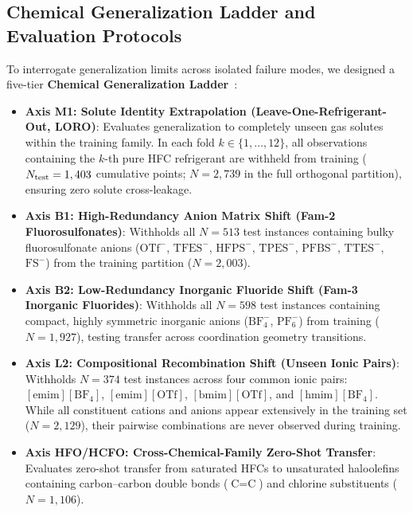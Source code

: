 \subsection{Chemical Generalization Ladder and Evaluation Protocols}
\label{subsec:generalization_ladder}

To interrogate generalization limits across isolated failure modes, we designed a five-tier \textbf{Chemical Generalization Ladder}~\cite{Choudhary2024_OODBenchmark,Wu2018_MoleculeNet}:

\begin{itemize}
    \item \textbf{Axis M1: Solute Identity Extrapolation (Leave-One-Refrigerant-Out, LORO)}: 
    Evaluates generalization to completely unseen gas solutes within the training family. In each fold $k \in \{1, \dots, 12\}$, all observations containing the $k$-th pure HFC refrigerant are withheld from training ($N_{\rm test} = 1,403$ cumulative points; $N=2,739$ in the full orthogonal partition), ensuring zero solute cross-leakage.
    
    \item \textbf{Axis B1: High-Redundancy Anion Matrix Shift (Fam-2 Fluorosulfonates)}: 
    Withholds all $N=513$ test instances containing bulky fluorosulfonate anions ($\text{OTf}^-$, $\text{TFES}^-$, $\text{HFPS}^-$, $\text{TPES}^-$, $\text{PFBS}^-$, $\text{TTES}^-$, $\text{FS}^-$) from the training partition ($N=2,003$).
    
    \item \textbf{Axis B2: Low-Redundancy Inorganic Fluoride Shift (Fam-3 Inorganic Fluorides)}: 
    Withholds all $N=598$ test instances containing compact, highly symmetric inorganic anions ($\text{BF}_4^-$, $\text{PF}_6^-$) from training ($N=1,927$), testing transfer across coordination geometry transitions.
    
    \item \textbf{Axis L2: Compositional Recombination Shift (Unseen Ionic Pairs)}: 
    Withholds $N=374$ test instances across four common ionic pairs: $[\text{emim}][\text{BF}_4]$, $[\text{emim}][\text{OTf}]$, $[\text{bmim}][\text{OTf}]$, and $[\text{hmim}][\text{BF}_4]$. While all constituent cations and anions appear extensively in the training set ($N=2,129$), their pairwise combinations are never observed during training.
    
    \item \textbf{Axis HFO/HCFO: Cross-Chemical-Family Zero-Shot Transfer}: 
    Evaluates zero-shot transfer from saturated HFCs to unsaturated haloolefins containing carbon--carbon double bonds ($\text{C}=\text{C}$) and chlorine substituents ($N=1,106$).
\end{itemize}

